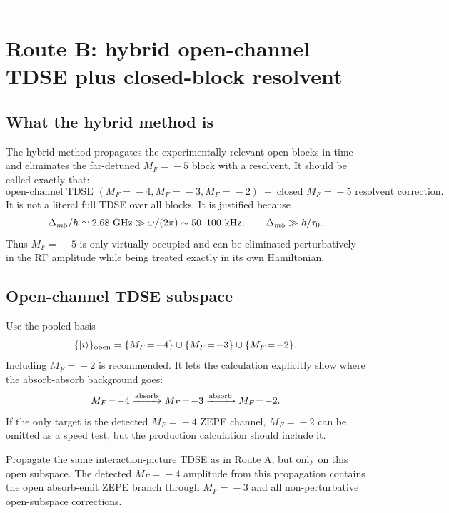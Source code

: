 \documentclass[11pt,a4paper]{article}
\newcommand{\MF}[1]{M_F\!=\!#1}
\newcommand{\ket}[1]{\lvert #1 \rangle}
\begin{document}
\medskip\hrule\medskip

\section{Route B: hybrid open-channel TDSE plus closed-block resolvent}

\subsection{What the hybrid method is}

The hybrid method propagates the experimentally relevant open blocks in time
and eliminates the far-detuned $\MF{-5}$ block with a resolvent.  It should be
called exactly that:
\begin{equation}
\boxed{\text{open-channel TDSE }(\MF{-4},\MF{-3},\MF{-2})
\; + \; \text{closed }\MF{-5}\text{ resolvent correction}.}
\end{equation}
It is not a literal full TDSE over all blocks.  It is justified because
\begin{equation}
\Delta_{m5}/h\simeq2.68\ {\rm GHz}\gg \omega/(2\pi)\sim50\text{--}100\ {\rm kHz},
\qquad
\Delta_{m5}\gg \hbar/\tau_0.
\end{equation}
Thus $\MF{-5}$ is only virtually occupied and can be eliminated perturbatively
in the RF amplitude while being treated exactly in its own Hamiltonian.

\subsection{Open-channel TDSE subspace}

Use the pooled basis
\begin{equation}
\{\ket{i}\}_{\rm open}=\{\MF{-4}\}\cup\{\MF{-3}\}\cup\{\MF{-2}\}.
\end{equation}
Including $\MF{-2}$ is recommended.  It lets the calculation explicitly show
where the absorb-absorb background goes:
\begin{equation}
\MF{-4}\xrightarrow{\rm absorb}\MF{-3}\xrightarrow{\rm absorb}\MF{-2}.
\end{equation}
If the only target is the detected $\MF{-4}$ ZEPE channel, $\MF{-2}$ can be
omitted as a speed test, but the production calculation should include it.

Propagate the same interaction-picture TDSE as in Route A, but only on this
open subspace.  The detected $\MF{-4}$ amplitude from this propagation contains
the open absorb-emit ZEPE branch through $\MF{-3}$ and all non-perturbative
open-subspace corrections.
\end{document}
